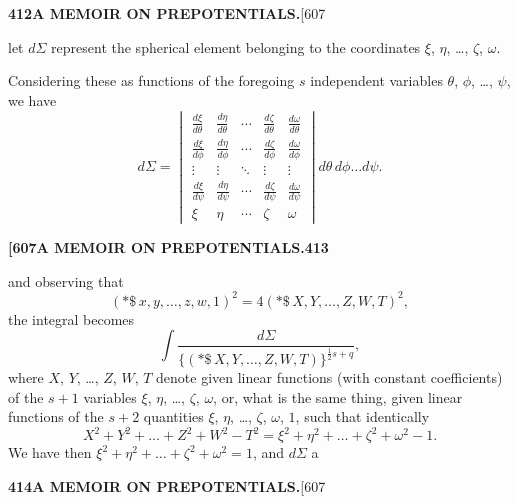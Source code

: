 \documentclass[11pt,a4paper]{book}
\begin{document}
{\newpage
\noindent\textbf{412}\hspace{\fill}\textbf{A MEMOIR ON PREPOTENTIALS.}\hspace{\fill}[607

let $d\Sigma$ represent the spherical element belonging to the coordinates $\xi$, $\eta$, \ldots, $\zeta$, $\omega$.

Considering these as functions of the foregoing $s$ independent variables $\theta$, $\phi$, \ldots, $\psi$, we have
\[
d\Sigma = \begin{vmatrix}
\frac{d\xi}{d\theta} & \frac{d\eta}{d\theta} & \cdots & \frac{d\zeta}{d\theta} & \frac{d\omega}{d\theta}\\[4pt]
\frac{d\xi}{d\phi} & \frac{d\eta}{d\phi} & \cdots & \frac{d\zeta}{d\phi} & \frac{d\omega}{d\phi}\\[4pt]
\vdots & \vdots & \ddots & \vdots & \vdots\\[4pt]
\frac{d\xi}{d\psi} & \frac{d\eta}{d\psi} & \cdots & \frac{d\zeta}{d\psi} & \frac{d\omega}{d\psi}\\[4pt]
\xi & \eta & \cdots & \zeta & \omega
\end{vmatrix} d\theta\, d\phi \ldots d\psi.
\]

\newpage
\noindent\textbf{[607}\hspace{\fill}\textbf{A MEMOIR ON PREPOTENTIALS.}\hspace{\fill}\textbf{413}

and observing that
\[
(*\!\!\$\, x, y, \ldots, z, w, 1)^2 = 4(*\!\!\$\, X, Y, \ldots, Z, W, T)^2,
\]
the integral becomes
\[
\int \frac{d\Sigma}{\{(*\!\!\$\, X, Y, \ldots, Z, W, T)\}^{\frac{1}{2}s+q}},
\]
where $X$, $Y$, \ldots, $Z$, $W$, $T$ denote given linear functions (with constant coefficients) of the $s+1$ variables $\xi$, $\eta$, \ldots, $\zeta$, $\omega$, or, what is the same thing, given linear functions of the $s+2$ quantities $\xi$, $\eta$, \ldots, $\zeta$, $\omega$, $1$, such that identically
\[
X^2 + Y^2 + \ldots + Z^2 + W^2 - T^2 = \xi^2 + \eta^2 + \ldots + \zeta^2 + \omega^2 - 1.
\]
We have then $\xi^2 + \eta^2 + \ldots + \zeta^2 + \omega^2 = 1$, and $d\Sigma$ a

\newpage
\noindent\textbf{414}\hspace{\fill}\textbf{A MEMOIR ON PREPOTENTIALS.}\hspace{\fill}[607

}
\end{document}
